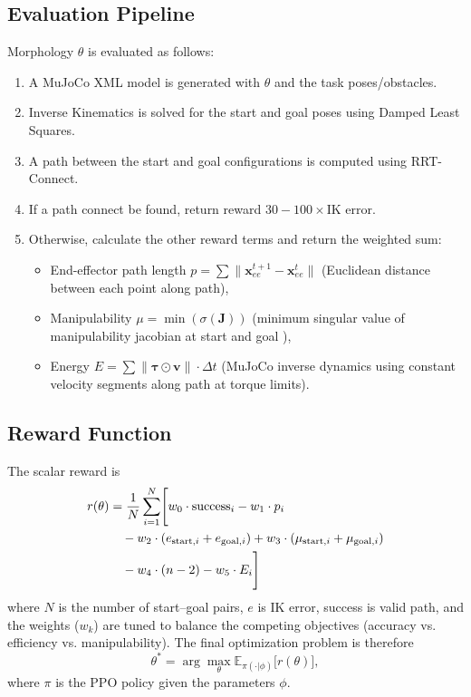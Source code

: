 \documentclass[defaultstyle,11pt]{thesis}
\begin{document}
\subsection{Evaluation Pipeline}

Morphology $\theta$ is evaluated as follows:
\begin{enumerate}
    \item A MuJoCo XML model is generated with $\theta$ and the task poses/obstacles.
    \item Inverse Kinematics is solved for the start and goal poses using Damped Least Squares.
    \item A path between the start and goal configurations is computed using RRT-Connect.
    \item If a path connect be found, return reward $30 - 100 \times \text{IK error}$.
    \item Otherwise, calculate the other reward terms and return the weighted sum:
    \begin{itemize}
        \item End-effector path length $p = \sum \|\mathbf{x}_{ee}^{t+1} - \mathbf{x}_{ee}^t\|$ (Euclidean distance between each point along path),
        \item Manipulability $\mu = \min(\sigma(\mathbf{J}))$ (minimum singular value of manipulability jacobian at start and goal \cite{klein1987dexterity}),
        \item Energy $E = \sum \|\boldsymbol{\tau} \odot \mathbf{v}\| \cdot \Delta t$ (MuJoCo inverse dynamics using constant velocity segments along path at torque limits).
    \end{itemize}
\end{enumerate}

\subsection{Reward Function}

The scalar reward is
\begin{align}
r(\theta) &= \frac{1}{N} \sum_{i=1}^{N} \Biggl[ 
    w_0 \cdot \text{success}_i 
    - w_1 \cdot p_i \notag \\
    &\quad - w_2 \cdot (e_{\text{start},i} + e_{\text{goal},i}) 
    + w_3 \cdot (\mu_{\text{start},i} + \mu_{\text{goal},i}) \notag \\
    &\quad - w_4 \cdot (n - 2) 
    - w_5 \cdot E_i 
\Biggr]
\label{eq:reward}
\end{align}
where $N$ is the number of start–goal pairs, $e$ is IK error, success is valid path, and the weights ($w_k$) are tuned to balance the competing objectives (accuracy vs. efficiency vs. manipulability). 
The final optimization problem is therefore
\[
\theta^* = \arg\max_{\theta} \mathbb{E}_{\pi(\cdot|\phi)} \bigl[ r(\theta) \bigr],
\]
where $\pi$ is the PPO policy given the parameters $\phi$.
\end{document}
